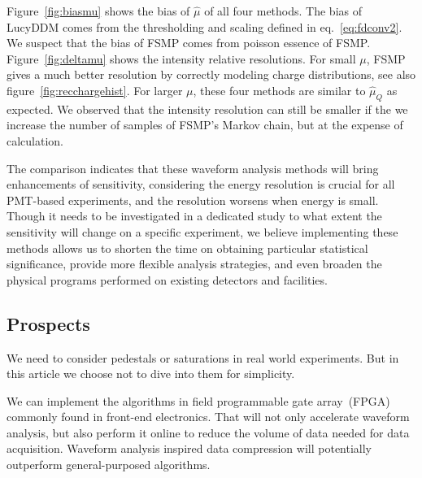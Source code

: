 Figure~\ref{fig:biasmu} shows the bias of $\hat{\mu}$ of all four methods. The bias of LucyDDM comes from the thresholding and scaling defined in eq.~\eqref{eq:fdconv2}. We suspect that the bias of FSMP comes from poisson essence of FSMP. Figure~\ref{fig:deltamu} shows the intensity relative resolutions. For small $\mu$, FSMP gives a much better resolution by correctly modeling charge distributions, see also figure~\ref{fig:recchargehist}. For larger $\mu$, these four methods are similar to $\hat{\mu}_Q$ as expected. We observed that the intensity resolution can still be smaller if the we increase the number of samples of FSMP's Markov chain, but at the expense of calculation. 

The comparison indicates that these waveform analysis methods will bring enhancements of sensitivity, considering the energy resolution is crucial for all PMT-based experiments, and the resolution worsens when energy is small. Though it needs to be investigated in a dedicated study to what extent the sensitivity will change on a specific experiment, we believe implementing these methods allows us to shorten the time on obtaining particular statistical significance, provide more flexible analysis strategies, and even broaden the physical programs performed on existing detectors and facilities. 


\subsection{Prospects}
\label{sec:prospects}

We need to consider pedestals or saturations in real world experiments.  But in this article we choose not to dive into them for simplicity.

We can implement the algorithms in field programmable gate array~(FPGA) commonly found in front-end electronics.  That will not only accelerate waveform analysis, but also perform it online to reduce the volume of data needed for data acquisition.  Waveform analysis inspired data compression will potentially outperform general-purposed algorithms.
